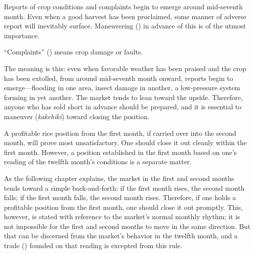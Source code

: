 
\begin{sokyubox}
{\small\itshape\color{sokyubar} }

\medskip
Reports of crop conditions and complaints begin to emerge around
mid-seventh month. Even when a good harvest has been proclaimed,
some manner of adverse report will inevitably surface. Maneuvering
() in advance of this is of the utmost importance.

``Complaints'' () means crop damage or faults.
\end{sokyubox}

\commentary
The meaning is this: even when favorable weather has been praised
and the crop has been extolled, from around mid-seventh month
onward, reports begin to emerge---flooding in one area, insect
damage in another, a low-pressure system forming in yet another.
The market tends to lean toward the upside. Therefore, anyone who
has sold short in advance should be prepared, and it is essential
to maneuver (\textit{kakehiki}) toward closing the position.


\begin{sokyubox}
{\small\itshape\color{sokyubar} }

\medskip
A profitable rice position from the first month, if carried over
into the second month, will prove most unsatisfactory. One should
close it out cleanly within the first month. However, a position
established in the first month based on one's reading of the
twelfth month's conditions is a separate matter.
\end{sokyubox}

\commentary
As the following chapter explains, the market in the first and
second months tends toward a simple back-and-forth: if the first
month rises, the second month falls; if the first month falls,
the second month rises. Therefore, if one holds a profitable
position from the first month, one should close it out promptly.
This, however, is stated with reference to the market's normal
monthly rhythm; it is not impossible for the first and second
months to move in the same direction. But that can be discerned
from the market's behavior in the twelfth month, and a trade
() founded on that reading is excepted from this
rule.

